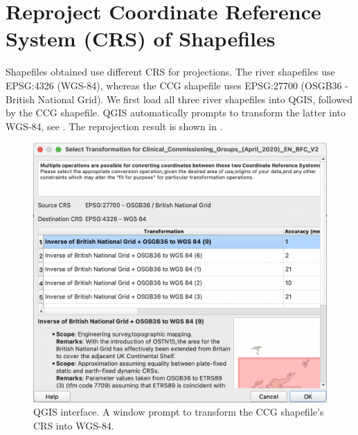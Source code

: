 \appendix

\section{Reproject Coordinate Reference System (CRS) of Shapefiles}
Shapefiles obtained use different CRS for projections. The river shapefiles use EPSG:4326 (WGS-84), whereas the CCG shapefile uses EPSG:27700 (OSGB36 - British National Grid). We first load all three river shapefiles into QGIS, followed by the CCG shapefile. QGIS automatically prompts to transform the latter into WGS-84, see . The reprojection result is shown in .

{
\begin{figure}[h!]
    \centering
    \includegraphics[width=\columnwidth]{figure/qgis/reproject.png}
    \caption{QGIS interface. A window prompt to transform the CCG shapefile's CRS into WGS-84.}
    \label{fig:reproject}
\end{figure}

}
